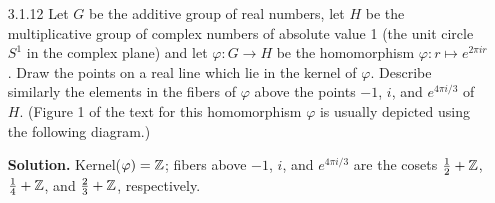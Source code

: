 \begin{enumerate}
   \item[3.1.12]  Let $G$ be the additive group of real numbers, let $H$ be the
                  multiplicative group of complex numbers of absolute value 1
                  (the unit circle $S^1$ in the complex plane) and let
                  $\varphi : G \rightarrow H$ be the homomorphism
                  $\varphi : r \mapsto e^{2\pi ir}$. Draw the points on a real
                  line which lie in the kernel of $\varphi$. Describe similarly
                  the elements in the fibers of $\varphi$ above the points $-1$,
                  $i$, and $e^{4\pi i/3}$ of $H$. (Figure 1 of the text for this
                  homomorphism $\varphi$ is usually depicted using the following
                  diagram.)

      \textbf{Solution.} Kernel($\varphi) = \mathbb{Z}$; fibers above $-1$, $i$, and
      $e^{4\pi i/3}$ are the cosets $ + \Z$, $ + \Z$, and
      $ + \Z$, respectively.


\end{enumerate}
